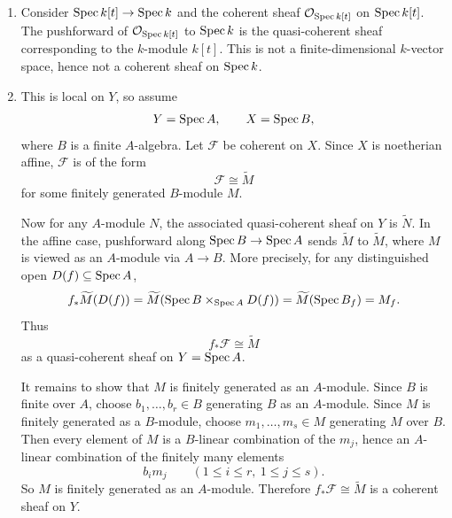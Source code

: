 \documentclass[12pt]{article}
\begin{document}
\begin{solution}
    \leavevmode
    \begin{enumerate}
        \item[(a)] Consider $\operatorname{Spec} k[t] \to \operatorname{Spec} k$ and the coherent sheaf $\mathcal{O}_{\operatorname{Spec} k[t]}$ on $\operatorname{Spec} k[t]$. The pushforward of $\mathcal{O}_{\operatorname{Spec} k[t]}$ to $\operatorname{Spec} k$ is the quasi-coherent sheaf corresponding to the $k$-module $k[t]$. This is not a finite-dimensional $k$-vector space, hence not a coherent sheaf on $\operatorname{Spec} k$.


        \item[(b)] This is local on \(Y\), so assume
              \[
                  Y=\operatorname{Spec} A,\qquad X=\operatorname{Spec} B,
              \]
              where \(B\) is a finite \(A\)-algebra. Let \(\mathcal F\) be coherent on \(X\). Since \(X\) is noetherian affine, \(\mathcal F\) is of the form
              \[
                  \mathcal F\cong \widetilde M
              \]
              for some finitely generated \(B\)-module \(M\).

              Now for any \(A\)-module \(N\), the associated quasi-coherent sheaf on \(Y\) is \(\widetilde N\). In the affine case, pushforward along \(\operatorname{Spec} B\to \operatorname{Spec} A\) sends \(\widetilde M\) to \(\widetilde M\), where \(M\) is viewed as an \(A\)-module via \(A\to B\). More precisely, for any distinguished open \(D(f)\subseteq \operatorname{Spec} A\),
              \[
                  f_*\widetilde M(D(f))
                  = \widetilde M(\operatorname{Spec} B\times_{\operatorname{Spec} A} D(f))
                  = \widetilde M(\operatorname{Spec} B_f)
                  = M_f.
              \]
              Thus
              \[
                  f_*\mathcal F \cong \widetilde M
              \]
              as a quasi-coherent sheaf on \(Y=\operatorname{Spec} A\).

              It remains to show that \(M\) is finitely generated as an \(A\)-module. Since \(B\) is finite over \(A\), choose \(b_1,\dots,b_r\in B\) generating \(B\) as an \(A\)-module. Since \(M\) is finitely generated as a \(B\)-module, choose \(m_1,\dots,m_s\in M\) generating \(M\) over \(B\). Then every element of \(M\) is a \(B\)-linear combination of the \(m_j\), hence an \(A\)-linear combination of the finitely many elements
              \[
                  b_i m_j \qquad (1\le i\le r,\ 1\le j\le s).
              \]
              So \(M\) is finitely generated as an \(A\)-module. Therefore \(f_*\mathcal F\cong \widetilde M\) is a coherent sheaf on \(Y\).
    \end{enumerate}
\end{solution}
\end{document}
